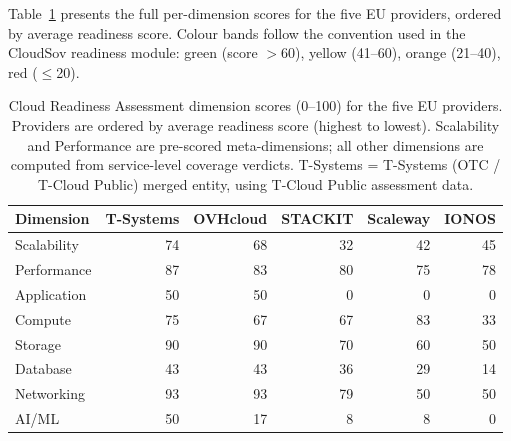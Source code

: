 Table~\ref{tab:readiness_dimensions} presents the full per-dimension scores for the five EU providers, ordered by average readiness score. Colour bands follow the convention used in the CloudSov readiness module: green (score $>$60), yellow (41--60), orange (21--40), red ($\leq$20).

\begin{table}[htbp]
\centering
\small
\setlength\tabcolsep{5pt}
\caption{Cloud Readiness Assessment dimension scores (0--100) for the five EU providers. Providers are ordered by average readiness score (highest to lowest). Scalability and Performance are pre-scored meta-dimensions; all other dimensions are computed from service-level coverage verdicts. T-Systems = T-Systems (OTC / T-Cloud Public) merged entity, using T-Cloud Public assessment data.}
\label{tab:readiness_dimensions}
\begin{tabular}{lrrrrr}
\toprule
\textbf{Dimension} & \textbf{T-Systems} & \textbf{OVHcloud} & \textbf{STACKIT} & \textbf{Scaleway} & \textbf{IONOS} \\
\midrule
Scalability    & \cellcolor{green!15}74  & \cellcolor{green!15}68  & \cellcolor{orange!30}32  & \cellcolor{yellow!35}42  & \cellcolor{yellow!35}45  \\
Performance    & \cellcolor{green!35}87  & \cellcolor{green!35}83  & \cellcolor{green!15}80  & \cellcolor{green!15}75  & \cellcolor{green!15}78  \\
Application    & \cellcolor{yellow!35}50  & \cellcolor{yellow!35}50  & \cellcolor{red!35}0      & \cellcolor{red!35}0      & \cellcolor{red!35}0      \\
Compute        & \cellcolor{green!15}75  & \cellcolor{green!15}67  & \cellcolor{green!15}67  & \cellcolor{green!35}83  & \cellcolor{orange!30}33  \\
Storage        & \cellcolor{green!35}90  & \cellcolor{green!35}90  & \cellcolor{green!15}70  & \cellcolor{yellow!35}60  & \cellcolor{yellow!35}50  \\
Database       & \cellcolor{yellow!35}43  & \cellcolor{yellow!35}43  & \cellcolor{orange!30}36  & \cellcolor{orange!30}29  & \cellcolor{red!35}14     \\
Networking     & \cellcolor{green!35}93  & \cellcolor{green!35}93  & \cellcolor{green!15}79  & \cellcolor{yellow!35}50  & \cellcolor{yellow!35}50  \\
AI/ML          & \cellcolor{yellow!35}50  & \cellcolor{red!35}17    & \cellcolor{red!35}8      & \cellcolor{red!35}8      & \cellcolor{red!35}0      \\

\end{tabular}
\end{table}
